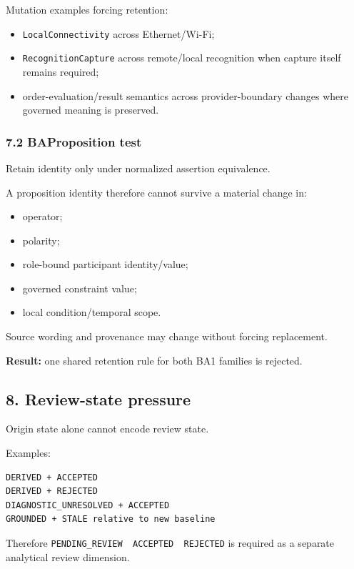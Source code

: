 \documentclass[11pt,a4paper]{article}
\providecommand{\tightlist}{\setlength{\itemsep}{0pt}\setlength{\parskip}{0pt}}\setlength{\emergencystretch}{4em}\hbadness=10000\hfuzz=20pt\sloppy
\begin{document}
Mutation examples forcing retention:

\begin{itemize}
\tightlist
\item
  \texttt{LocalConnectivity} across Ethernet/Wi-Fi;
\item
  \texttt{RecognitionCapture} across remote/local recognition when
  capture itself remains required;
\item
  order-evaluation/result semantics across provider-boundary changes
  where governed meaning is preserved.
\end{itemize}

\subsubsection{7.2 BAProposition test}\label{baproposition-test}

Retain identity only under normalized assertion equivalence.

A proposition identity therefore cannot survive a material change in:

\begin{itemize}
\tightlist
\item
  operator;
\item
  polarity;
\item
  role-bound participant identity/value;
\item
  governed constraint value;
\item
  local condition/temporal scope.
\end{itemize}

Source wording and provenance may change without forcing replacement.

\textbf{Result:} one shared retention rule for both BA1 families is
rejected.

\subsection{8. Review-state pressure}\label{review-state-pressure}

Origin state alone cannot encode review state.

Examples:

\begin{verbatim}
DERIVED + ACCEPTED
DERIVED + REJECTED
DIAGNOSTIC_UNRESOLVED + ACCEPTED
GROUNDED + STALE relative to new baseline
\end{verbatim}

Therefore
\texttt{PENDING\_REVIEW\ \textbar{}\ ACCEPTED\ \textbar{}\ REJECTED} is
required as a separate analytical review dimension.
\end{document}
